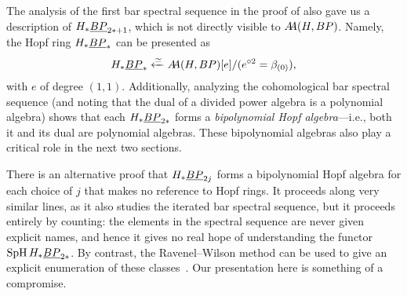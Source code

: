 \begin{remark}
The analysis of the first bar spectral sequence in the proof of  also gave us a description of \(H_* \OS{BP}{2*+1}\), which is not directly visible to \(\AA(H, BP)\).  Namely, the Hopf ring \(H_* \OS{BP}{*}\) can be presented as \[H_* \OS{BP}{*} \xleftarrow{\simeq} \AA(H, BP)[e] / (e^{\circ 2} = \beta_{(0)}),\] with \(e\) of degree \((1, 1)\).  Additionally, analyzing the cohomological bar spectral sequence (and noting that the dual of a divided power algebra is a polynomial algebra) shows that each \(H_* \OS{BP}{2*}\) forms a \textit{bipolynomial Hopf algebra}---i.e., both it and its dual are polynomial algebras.  These bipolynomial algebras also play a critical role in the next two sections.
\end{remark}

\begin{remark}
There is an alternative proof that \(H_* \OS{BP}{2j}\) forms a bipolynomial Hopf algebra for each choice of \(j\) that makes no reference to Hopf rings.  It proceeds along very similar lines, as it also studies the iterated bar spectral sequence, but it proceeds entirely by counting: the elements in the spectral sequence are never given explicit names, and hence it gives no real hope of understanding the functor \(\SpH H_* \OS{BP}{2*}\).  By contrast, the Ravenel--Wilson method can be used to give an explicit enumeration of these classes~\cite[Section 5]{RavenelWilsonHopfRingForMU}.  Our presentation here is something of a compromise.
\end{remark}

